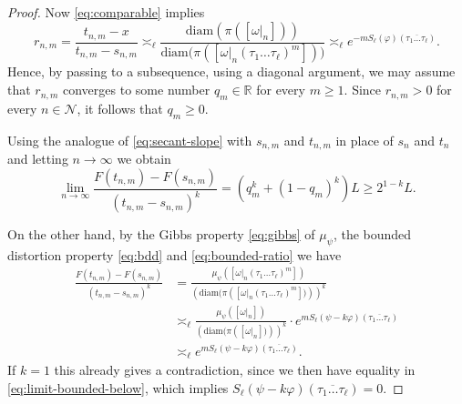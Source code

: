 \documentclass[11pt]{amsart}
\newcommand\diam{\mathrm{diam}}
\newcommand{\1}{1}
\begin{document}
\begin{proof}
Now \eqref{eq:comparable} implies 
\begin{equation}
\label{eq:rn-bdd}
r_{n,m}=\frac{t_{n,m}-x}{t_{n,m}-s_{n,m}}\asymp_\ell\frac{\diam\left(\pi\left(\left[\omega|_{n}\right]\right)\right)}{\diam\big(\pi\left(\left[\omega|_{n}(\tau_{1}\dots \tau_{\ell})^{m}\right]\right)\big)}\asymp_\ell e^{-mS_{\ell}\left(\varphi\right)(\overline{\tau_{1}\dots \tau_{\ell}})}.
\end{equation}
Hence, by passing to a subsequence, using a diagonal argument, we may assume that $r_{n,m}$ converges to some number $q_m \in \mathbb{R}$ for every $m\ge 1$.  {Since $r_{n,m}>0$ for every $n\in\mathcal{N}$, it follows that $q_m\geq 0$.}

Using {the analogue of \eqref{eq:secant-slope} with $s_{n,m}$ and $t_{n,m}$ in place of $s_n$ and $t_n$} and letting $n\rightarrow \infty$ we obtain 
\begin{equation} \label{eq:limit-bounded-below}
\lim_{n\to\infty}\frac{F(t_{n,m})-F(s_{n,m})}{(t_{n,m}-s_{n,m})^k} =\left(q_{m}^k+(1-q_{m})^k\right)L \ge 2^{1-k}L.
\end{equation}

On the other hand, by the Gibbs property \eqref{eq:gibbs} of $\mu_\psi$, the bounded distortion property \eqref{eq:bdd} and \eqref{eq:bounded-ratio} we have  
\begin{align*}
\frac{F(t_{n,m})-F(s_{n,m})}{(t_{n,m}-s_{n,m})^k} & =\frac{\mu_\psi\left(\left[\omega|_{n}(\tau_{1}\dots \tau_{\ell})^{m}\right]\right)}{\left(\diam(\pi\left(\left[\omega|_{n}(\tau_{1}\dots \tau_{\ell})^{m}\right])\right)\right)^k}\\
 & \asymp_\ell\frac{\mu_\psi\left(\left[\omega|_{n}\right]\right)}{\left(\diam(\pi\left(\left[\omega|_{n}\right])\right)\right)^k}\cdot e^{mS_{\ell}\left(\psi-k\varphi\right)(\overline{\tau_{1}\dots \tau_{\ell}})}\\
 & \asymp_\ell e^{mS_{\ell}\left(\psi-k\varphi\right)(\overline{\tau_{1}\dots \tau_{\ell}})}.
\end{align*}
If $k=1$ this already gives a contradiction, since we then have equality in \eqref{eq:limit-bounded-below}, which implies $S_{\ell}\left(\psi-k\varphi\right)(\overline{\tau_{1}\dots \tau_{\ell}})=0$.


\end{proof}
\end{document}
